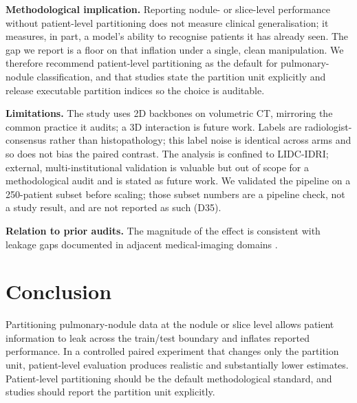 \documentclass{article}
\newcommand{\vcite}[1]{\cite{#1}}
\begin{document}
\textbf{Methodological implication.} Reporting nodule- or slice-level performance without
patient-level partitioning does not measure clinical generalisation; it measures, in part, a
model's ability to recognise patients it has already seen. The gap we report is a floor on that
inflation under a single, clean manipulation. We therefore recommend patient-level partitioning as
the default for pulmonary-nodule classification, and that studies state the partition unit
explicitly and release executable partition indices so the choice is auditable.

\textbf{Limitations.} The study uses 2D backbones on volumetric CT, mirroring the common practice
it audits; a 3D interaction is future work. Labels are radiologist-consensus rather than
histopathology; this label noise is identical across arms and so does not bias the paired
contrast. The analysis is confined to LIDC-IDRI; external, multi-institutional validation is
valuable but out of scope for a methodological audit and is stated as future work. We validated the
pipeline on a 250-patient subset before scaling; those subset numbers are a pipeline check, not a
study result, and are not reported as such (D35).

\textbf{Relation to prior audits.} The magnitude of the effect is consistent with leakage gaps
documented in adjacent medical-imaging domains \vcite{wen2020,roberts2021}.

\section{Conclusion}
Partitioning pulmonary-nodule data at the nodule or slice level allows patient information to leak
across the train/test boundary and inflates reported performance. In a controlled paired
experiment that changes only the partition unit, patient-level evaluation produces realistic and
substantially lower estimates. Patient-level partitioning should be the default methodological
standard, and studies should report the partition unit explicitly.

\end{document}
